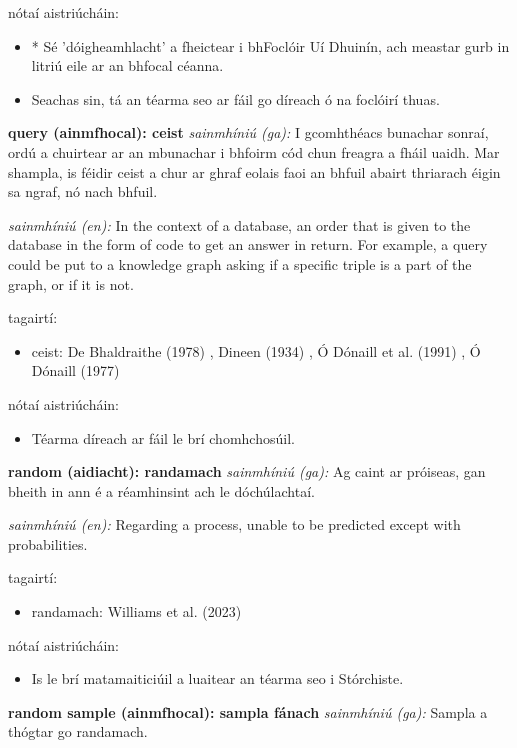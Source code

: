 \documentclass{article}
\begin{document}
nótaí aistriúcháin:
\begin{itemize}
	\item * Sé 'dóigheamhlacht' a fheictear i bhFoclóir Uí Dhuinín, ach meastar gurb in litriú eile ar an bhfocal céanna.
	\item Seachas sin, tá an téarma seo ar fáil go díreach ó na foclóirí thuas.
\end{itemize}


\textbf{query (ainmfhocal): ceist}
\textit{sainmhíniú (ga):} I gcomhthéacs bunachar sonraí, ordú a chuirtear ar an mbunachar i bhfoirm cód chun freagra a fháil uaidh. Mar shampla, is féidir ceist a chur ar ghraf eolais faoi an bhfuil abairt thriarach éigin sa ngraf, nó nach bhfuil.

\textit{sainmhíniú (en):} In the context of a database, an order that is given to the database in the form of code to get an answer in return. For example, a query could be put to a knowledge graph asking if a specific triple is a part of the graph, or if it is not.

tagairtí:
\begin{itemize}
	\item ceist: De Bhaldraithe (1978) \cite{de-bhaldraithe}, Dineen (1934) \cite{dineen}, Ó Dónaill et al. (1991) \cite{focloir-beag}, Ó Dónaill (1977) \cite{odonaill}
\end{itemize}

nótaí aistriúcháin:
\begin{itemize}
	\item Téarma díreach ar fáil le brí chomhchosúil.
\end{itemize}


\textbf{random (aidiacht): randamach}
\textit{sainmhíniú (ga):} Ag caint ar próiseas, gan bheith in ann é a réamhinsint ach le dóchúlachtaí.

\textit{sainmhíniú (en):} Regarding a process, unable to be predicted except with probabilities.

tagairtí:
\begin{itemize}
	\item randamach: Williams et al. (2023) \cite{storchiste}
\end{itemize}

nótaí aistriúcháin:
\begin{itemize}
	\item Is le brí matamaiticiúil a luaitear an téarma seo i Stórchiste.
\end{itemize}


\textbf{random sample (ainmfhocal): sampla fánach}
\textit{sainmhíniú (ga):} Sampla a thógtar go randamach.
\end{document}
